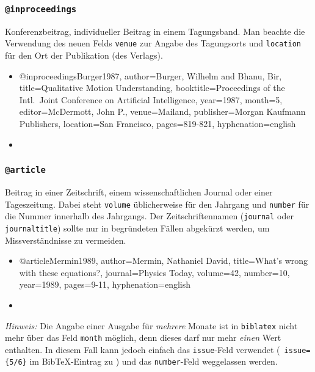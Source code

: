 
\subsubsection{\texttt{@inproceedings}}
\label{sec:@inproceedings}
Konferenzbeitrag, individueller Beitrag in einem Tagungsband.
Man beachte die Verwendung des neuen Felds \texttt{venue}
zur Angabe des Tagungsorts und 
\texttt{location} für den Ort der Publikation (des Verlags).
%
\begin{itemize}
\item[]
\begin{GenericCode}[numbers=none]
@inproceedings{Burger1987,
  author={Burger, Wilhelm and Bhanu, Bir},
  title={Qualitative Motion Understanding},
  booktitle={Proceedings of the Intl.\ Joint Conference on Artificial Intelligence},
  year={1987},
  month={5},
  editor={McDermott, John P.},
  venue={Mailand},
  publisher={Morgan Kaufmann Publishers},
  location={San Francisco},
  pages={819-821},
  hyphenation={english}
}
\end{GenericCode}
\item[\cite{Burger1987}] 
\end{itemize}


\subsubsection{\texttt{@article}}
\label{sec:@article}
Beitrag in einer Zeitschrift, einem wissenschaftlichen Journal oder einer Tageszeitung.
Dabei steht \texttt{volume} üblicherweise für den Jahrgang und \texttt{number} für die 
Nummer innerhalb des Jahrgangs. Der Zeitschriftennamen (\texttt{journal} oder
\texttt{journaltitle}) sollte nur in begründeten Fällen abgekürzt werden, um Missverständnisse
zu vermeiden.
%
\begin{itemize}
\item[]
\begin{GenericCode}[numbers=none]
@article{Mermin1989,
  author={Mermin, Nathaniel David},
  title={What's wrong with these equations?},
  journal={Physics Today},
  volume={42},
  number={10},
  year={1989},
  pages={9-11},
  hyphenation={english}
}
\end{GenericCode}
\item[\cite{Mermin1989}] 
\end{itemize}
%
\emph{Hinweis:} Die Angabe einer Ausgabe für \emph{mehrere} Monate ist in \texttt{biblatex} nicht mehr
über das Feld \texttt{month} möglich, denn dieses darf nur mehr \emph{einen} Wert enthalten.
In diesem Fall kann jedoch einfach das \texttt{issue}-Feld verwendet (\zB\ \texttt{issue=\{5/6\}}
im BibTeX-Eintrag zu \cite{Guttman2001}) und das \texttt{number}-Feld weggelassen werden.

